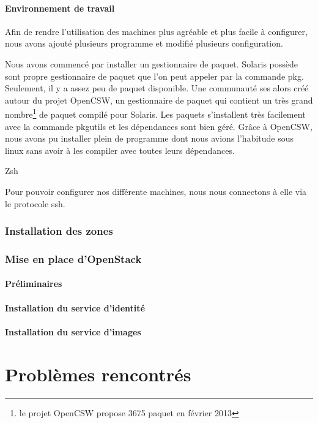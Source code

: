 \documentclass{report}
\begin{document}
\subsubsection{Environnement de travail}
Afin de rendre l'utilisation des machines plus agréable et plus facile à configurer, nous avons ajouté plusieurs programme et modifié plusieurs configuration.

Nous avons commencé par installer un gestionnaire de paquet. Solaris possède sont propre gestionnaire de paquet que l'on peut appeler par la commande pkg. Seulement, il y a assez peu de paquet disponible. Une communauté ses alors créé autour du projet OpenCSW, un gestionnaire de paquet qui contient un très grand nombre\footnote{le projet OpenCSW propose 3675 paquet en février 2013} de paquet compilé pour Solaris. Les paquets s'installent très facilement avec la commande pkgutils et les dépendances sont bien géré. Grâce à OpenCSW, nous avons pu installer plein de programme dont nous avions l'habitude sous linux sans avoir à les compiler avec toutes leurs dépendances. 

Zsh

Pour pouvoir configurer nos différente machines, nous nous connectons à elle via le protocole ssh.

\subsection{Installation des zones}

\subsection{Mise en place d'OpenStack}
\subsubsection{Préliminaires}

\subsubsection{Installation du service d'identité}

\subsubsection{Installation du service d'images}

\chapter{Problèmes rencontrés}
\end{document}
